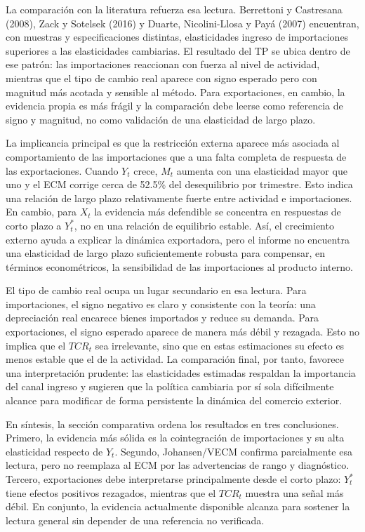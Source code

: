 \documentclass[11pt,a4paper]{article}
\begin{document}
	La comparación con la literatura refuerza esa lectura. Berrettoni y Castresana
	(2008), Zack y Sotelsek (2016) y Duarte, Nicolini-Llosa y Payá (2007)
	encuentran, con muestras y especificaciones distintas, elasticidades ingreso de
	importaciones superiores a las elasticidades cambiarias. El resultado del TP se
	ubica dentro de ese patrón: las importaciones reaccionan con fuerza al nivel de
	actividad, mientras que el tipo de cambio real aparece con signo esperado pero
	con magnitud más acotada y sensible al método. Para exportaciones, en cambio,
	la evidencia propia es más frágil y la comparación debe leerse como referencia
	de signo y magnitud, no como validación de una elasticidad de largo plazo.

	La implicancia principal es que la restricción externa aparece más asociada al
	comportamiento de las importaciones que a una falta completa de respuesta de las
	exportaciones. Cuando \(Y_t\) crece, \(M_t\) aumenta con una elasticidad mayor
	que uno y el ECM corrige cerca de 52.5\% del desequilibrio por trimestre. Esto
	indica una relación de largo plazo relativamente fuerte entre actividad e
	importaciones. En cambio, para \(X_t\) la evidencia más defendible se concentra
	en respuestas de corto plazo a \(Y_t^*\), no en una relación de equilibrio
	estable. Así, el crecimiento externo ayuda a explicar la dinámica exportadora,
	pero el informe no encuentra una elasticidad de largo plazo suficientemente
	robusta para compensar, en términos econométricos, la sensibilidad de las
	importaciones al producto interno.

	El tipo de cambio real ocupa un lugar secundario en esa lectura. Para
	importaciones, el signo negativo es claro y consistente con la teoría: una
	depreciación real encarece bienes importados y reduce su demanda. Para
	exportaciones, el signo esperado aparece de manera más débil y rezagada. Esto
	no implica que el \(TCR_t\) sea irrelevante, sino que en estas estimaciones su
	efecto es menos estable que el de la actividad. La comparación final, por
	tanto, favorece una interpretación prudente: las elasticidades estimadas
	respaldan la importancia del canal ingreso y sugieren que la política cambiaria
	por sí sola difícilmente alcance para modificar de forma persistente la
	dinámica del comercio exterior.

	En síntesis, la sección comparativa ordena los resultados en tres conclusiones.
	Primero, la evidencia más sólida es la cointegración de importaciones y su alta
	elasticidad respecto de \(Y_t\). Segundo, Johansen/VECM confirma parcialmente
	esa lectura, pero no reemplaza al ECM por las advertencias de rango y
	diagnóstico. Tercero, exportaciones debe interpretarse principalmente desde el
	corto plazo: \(Y_t^*\) tiene efectos positivos rezagados, mientras que el
	\(TCR_t\) muestra una señal más débil. En conjunto, la evidencia actualmente
	disponible alcanza para sostener la lectura general sin depender de una
	referencia no verificada.
\end{document}
